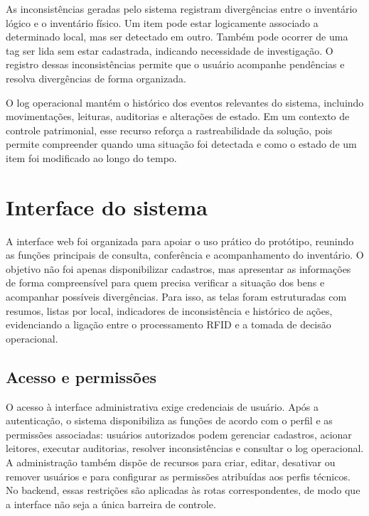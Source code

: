 As inconsistências geradas pelo sistema registram divergências entre o inventário lógico e o inventário físico. Um item pode estar logicamente associado a determinado local, mas ser detectado em outro. Também pode ocorrer de uma tag ser lida sem estar cadastrada, indicando necessidade de investigação. O registro dessas inconsistências permite que o usuário acompanhe pendências e resolva divergências de forma organizada.

O log operacional mantém o histórico dos eventos relevantes do sistema, incluindo movimentações, leituras, auditorias e alterações de estado. Em um contexto de controle patrimonial, esse recurso reforça a rastreabilidade da solução, pois permite compreender quando uma situação foi detectada e como o estado de um item foi modificado ao longo do tempo.

\section{Interface do sistema}
\label{sec:interface-sistema}

A interface web foi organizada para apoiar o uso prático do protótipo, reunindo as funções principais de consulta, conferência e acompanhamento do inventário. O objetivo não foi apenas disponibilizar cadastros, mas apresentar as informações de forma compreensível para quem precisa verificar a situação dos bens e acompanhar possíveis divergências. Para isso, as telas foram estruturadas com resumos, listas por local, indicadores de inconsistência e histórico de ações, evidenciando a ligação entre o processamento RFID e a tomada de decisão operacional.

\subsection{Acesso e permissões}
\label{sec:acesso-permissoes}

O acesso à interface administrativa exige credenciais de usuário. Após a autenticação, o sistema disponibiliza as funções de acordo com o perfil e as permissões associadas: usuários autorizados podem gerenciar cadastros, acionar leitores, executar auditorias, resolver inconsistências e consultar o log operacional. A administração também dispõe de recursos para criar, editar, desativar ou remover usuários e para configurar as permissões atribuídas aos perfis técnicos. No backend, essas restrições são aplicadas às rotas correspondentes, de modo que a interface não seja a única barreira de controle.

